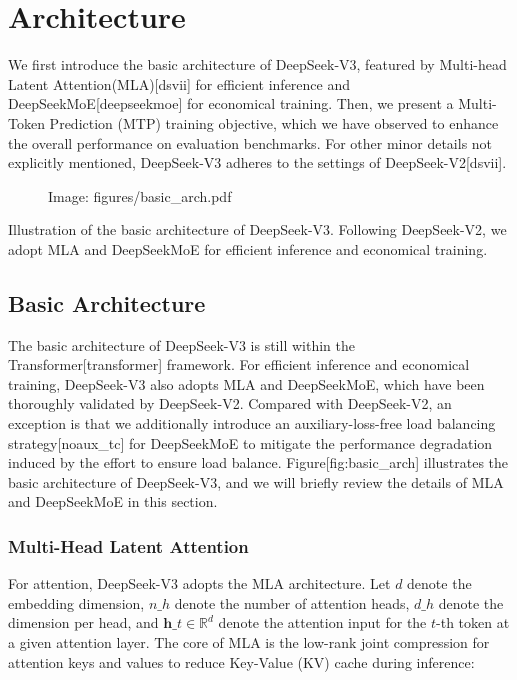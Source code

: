 \documentclass[11pt,a4paper]{article}
\begin{document}
\section{Architecture}

We first introduce the basic architecture of DeepSeek-V3, featured by Multi-head Latent Attention(MLA)[dsvii] for efficient inference and DeepSeekMoE[deepseekmoe] for economical training.
Then, we present a Multi-Token Prediction (MTP) training objective, which we have observed to enhance the overall performance on evaluation benchmarks.
For other minor details not explicitly mentioned, DeepSeek-V3 adheres to the settings of DeepSeek-V2[dsvii].

\begin{figure}[h]
\caption{Image: figures/basic\_arch.pdf}
\end{figure}

Illustration of the basic architecture of DeepSeek-V3. 
 Following DeepSeek-V2, we adopt MLA and DeepSeekMoE for efficient inference and economical training.

\subsection{Basic Architecture}

The basic architecture of DeepSeek-V3 is still within the Transformer[transformer] framework. 
For efficient inference and economical training, DeepSeek-V3 also adopts MLA and DeepSeekMoE, which have been thoroughly validated by DeepSeek-V2. 
Compared with DeepSeek-V2, an exception is that we additionally introduce an auxiliary-loss-free load balancing strategy[noaux\_tc] for DeepSeekMoE to mitigate the performance degradation induced by the effort to ensure load balance. 
Figure[fig:basic\_arch] illustrates the basic architecture of DeepSeek-V3, and we will briefly review the details of MLA and DeepSeekMoE in this section.

\subsubsection{Multi-Head Latent Attention}

For attention, DeepSeek-V3 adopts the MLA architecture. 
Let $d$ denote the embedding dimension, $n\_h$ denote the number of attention heads, $d\_h$ denote the dimension per head, and $\mathbf{h}\_{t} \in \mathbb{R}^{d}$ denote the attention input for the $t$-th token at a given attention layer.
The core of MLA is the low-rank joint compression for attention keys and values to reduce Key-Value (KV) cache during inference:
\end{document}
